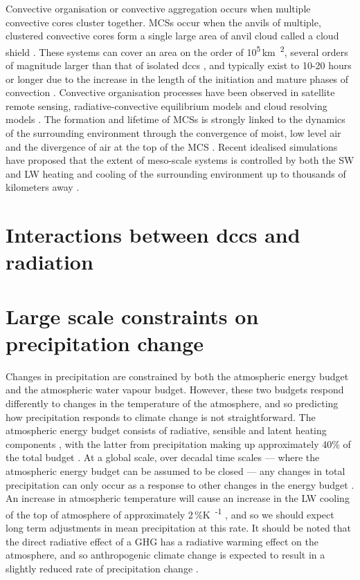 Convective organisation or convective aggregation occurs when multiple convective cores cluster together. MCSs occur when the anvils of multiple, clustered convective cores form a single large area of anvil cloud called a cloud shield \citep{roca_simple_2017}. 
These systems can cover an area on the order of 10\textsuperscript{5}\,\unit{km\textsuperscript{2}}, several orders of magnitude larger than that of isolated \acrshort{dcc}s \citep{houze_mesoscale_2004}, and typically exist to 10-20 hours or longer \citep{chen_diurnal_1997} due to the increase in the length of the initiation and mature phases of convection \citep{wall_life_2018}.
Convective organisation processes have been observed in satellite remote sensing, radiative-convective equilibrium models and cloud resolving models \citep{holloway_observing_2017}. 
The formation and lifetime of MCSs is strongly linked to the dynamics of the surrounding environment through the convergence of moist, low level air and the divergence of air at the top of the MCS \citep{houze_chapter_2014}. 
Recent idealised simulations have proposed that the extent of meso-scale systems is controlled by both the SW and LW heating and cooling of the surrounding environment up to thousands of kilometers away \citep{beucler_budget_2019}. 



\section{Interactions between \acrshort{dcc}s and radiation}



\section{Large scale constraints on precipitation change}


Changes in precipitation are constrained by both the atmospheric energy budget and the atmospheric water vapour budget.
However, these two budgets respond differently to changes in the temperature of the atmosphere, and so predicting how precipitation responds to climate change is not straightforward.
The atmospheric energy budget consists of radiative, sensible and latent heating components \citep{trenberth_earths_2009}, with the latter from precipitation making up approximately 40\% of the total budget \citep{rosenfeld_flood_2008}.
At a global scale, over decadal time scales --- where the atmospheric energy budget can be assumed to be closed --- any changes in total precipitation can only occur as a response to other changes in the energy budget \citep{allen_constraints_2002}.
An increase in atmospheric temperature will cause an increase in the LW cooling of the top of atmosphere of approximately 2\,\%\unit{K\textsuperscript{-1}} \citep{held_robust_2006}, and so we should expect long term adjustments in mean precipitation at this rate.
It should be noted that the direct radiative effect of a GHG has a radiative warming effect on the atmosphere, and so anthropogenic climate change is expected to result in a slightly reduced rate of precipitation change \citep{allen_constraints_2002}.

